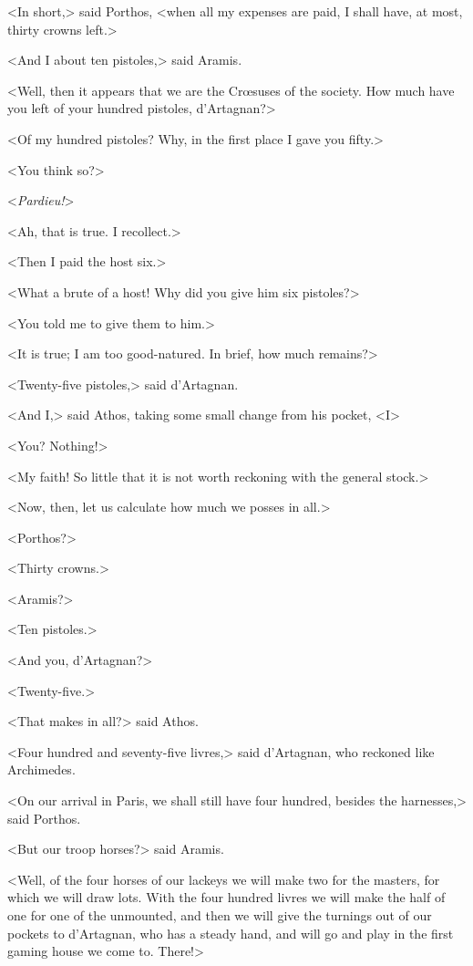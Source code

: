 <In short,> said Porthos, <when all my expenses are paid, I shall have, at most, thirty crowns left.> 

<And I about ten pistoles,> said Aramis. 

<Well, then it appears that we are the Crœsuses of the society. How much have you left of your hundred pistoles, d'Artagnan?> 

<Of my hundred pistoles? Why, in the first place I gave you fifty.> 

<You think so?> 

<\textit{Pardieu!}> 

<Ah, that is true. I recollect.> 

<Then I paid the host six.> 

<What a brute of a host! Why did you give him six pistoles?> 

<You told me to give them to him.> 

<It is true; I am too good-natured. In brief, how much remains?> 

<Twenty-five pistoles,> said d'Artagnan. 

<And I,> said Athos, taking some small change from his pocket, <I\longdash> 

<You? Nothing!> 

<My faith! So little that it is not worth reckoning with the general stock.> 

<Now, then, let us calculate how much we posses in all.> 

<Porthos?> 

<Thirty crowns.> 

<Aramis?> 

<Ten pistoles.> 

<And you, d'Artagnan?> 

<Twenty-five.> 

<That makes in all?> said Athos. 

<Four hundred and seventy-five livres,> said d'Artagnan, who reckoned like Archimedes. 

<On our arrival in Paris, we shall still have four hundred, besides the harnesses,> said Porthos. 

<But our troop horses?> said Aramis. 

<Well, of the four horses of our lackeys we will make two for the masters, for which we will draw lots. With the four hundred livres we will make the half of one for one of the unmounted, and then we will give the turnings out of our pockets to d'Artagnan, who has a steady hand, and will go and play in the first gaming house we come to. There!> 

